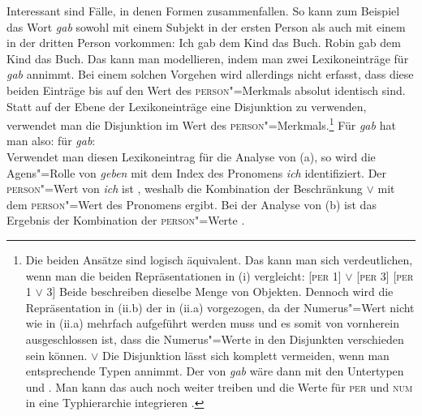 Interessant sind Fälle, in denen Formen zusammenfallen. So kann zum Beispiel das Wort
\emph{gab} sowohl mit einem Subjekt in der ersten Person als auch mit einem in der dritten Person vorkommen:
\eal
\ex Ich gab dem Kind das Buch.
\ex Robin gab dem Kind das Buch.
\zl
Das kann man modellieren, indem man zwei Lexikoneinträge für \emph{gab} annimmt. Bei einem solchen Vorgehen
wird allerdings nicht erfasst, dass diese beiden Einträge bis auf den Wert des \textsc{person}"=Merkmals absolut
identisch sind. Statt auf der Ebene der Lexikoneinträge eine Disjunktion zu verwenden, verwendet man
die Disjunktion im Wert des \textsc{person}"=Merkmals.\footnote{
  Die beiden Ansätze sind logisch äquivalent. Das kann man sich verdeutlichen, wenn man die
  beiden Repräsentationen in (i) vergleicht:
  \eal
  \ex {} [\textsc{per} 1] $\vee$ [\textsc{per} 3]
  \ex {} [\textsc{per} 1 $\vee$ 3]
  \zl
  Beide beschreiben dieselbe Menge von Objekten. Dennoch wird die Repräsentation in (ii.b) der
  in (ii.a) vorgezogen, da der Numerus"=Wert nicht wie in (ii.a) mehrfach aufgeführt werden
  muss und es somit von vornherein ausgeschlossen ist, dass die Numerus"=Werte in den Disjunkten
  verschieden sein können.
  \eal
  \ex {}  $\vee$ 
  \ex {}
  \zl
Die Disjunktion lässt sich komplett vermeiden, wenn man entsprechende Typen annimmt. Der \perw von
\emph{gab} wäre dann  mit den Untertypen  und . Man kann das auch
noch weiter treiben und die Werte für \textsc{per} und \textsc{num} in eine Typhierarchie
integrieren \citet[19]{Flickinger2000a}.
}
Für \emph{gab} hat man also:
\eas
\label{le-gab}%
\catw für \emph{gab}:\\
\zs
Verwendet man diesen Lexikoneintrag für die Analyse von (a), so wird die Agens"=Rolle
von \emph{geben} mit dem Index des Pronomens \emph{ich} identifiziert. Der \textsc{person}"=Wert von
\emph{ich} ist , weshalb die Kombination der Beschränkung  $\vee$\!  mit dem \textsc{person}"=Wert 
des Pronomens  ergibt. Bei der Analyse von (b) ist das Ergebnis der Kombination
der \textsc{person}"=Werte .

